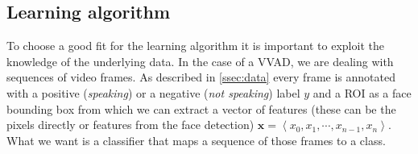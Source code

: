 \subsection{Learning algorithm}\label{ssec:algorithm}
To choose a good fit for the learning algorithm it is important to exploit the knowledge of the underlying data. In the case of a VVAD, we are dealing with sequences of video frames.
%
As described in \ref{ssec:data} every frame is annotated with a positive (\emph{speaking}) or a negative (\emph{not speaking}) label $y$ and a ROI as a face bounding box from which we can extract a vector of features (these can be the pixels directly or features from the face detection) $\mathbf{x} = \left\langle x_{0}, x_{1}, \cdots , x_{n-1}, x_{n} \right\rangle$. What we want is a classifier that maps a sequence of those frames to a class.
